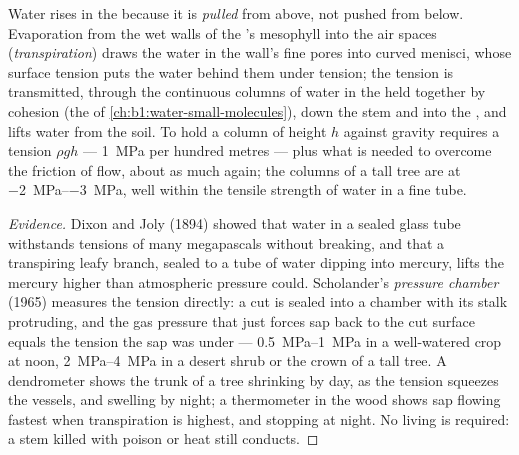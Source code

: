 \begin{theorem}\label{thm:b1:plant-transport:cohesiontension}
Water rises in the  because it is \emph{pulled} from above, not
pushed from below. Evaporation from the wet walls of the 's
mesophyll  into the air spaces (\emph{transpiration}) draws the
water in the wall's fine pores into curved menisci, whose surface
tension puts the water behind them under tension; the tension is
transmitted, through the continuous columns of water in the 
held together by cohesion (the  of
\cref{ch:b1:water-small-molecules}), down the stem and into the ,
and lifts water from the soil. To hold a column of height $h$ against
gravity requires a tension $\rho g h$ --- \qty{1}{MPa} per hundred
metres --- plus what is needed to overcome the friction of flow, about
as much again; the columns of a tall tree are at \qtyrange{-2}{-3}{MPa},
well within the tensile strength of water in a fine tube.
\end{theorem}
\begin{proof}[Evidence]
Dixon and Joly (1894) showed that water in a sealed glass tube
withstands tensions of many megapascals without breaking, and that a
transpiring leafy branch, sealed to a tube of water dipping into
mercury, lifts the mercury higher than atmospheric pressure could.
Scholander's \emph{pressure chamber} (1965) measures the tension
directly: a cut  is sealed into a chamber with its stalk
protruding, and the gas pressure that just forces sap back to the cut
surface equals the tension the sap was under --- \qtyrange{0.5}{1}{MPa}
in a well-watered crop at noon, \qtyrange{2}{4}{MPa} in a desert shrub
or the crown of a tall tree. A dendrometer shows the trunk of a tree
shrinking by day, as the tension squeezes the vessels, and swelling by
night; a thermometer in the wood shows sap flowing fastest when
transpiration is highest, and stopping at night. No living  is
required: a stem killed with poison or heat still conducts.
\end{proof}

